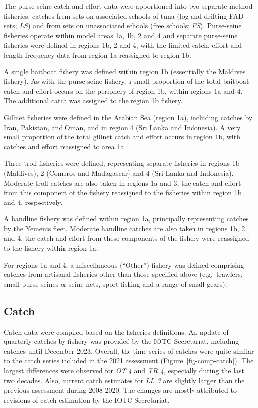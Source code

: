 \documentclass[
]{scrartcl}
\begin{document}
The purse-seine catch and effort data were apportioned into two separate
method fisheries: catches from sets on associated schools of tuna (log
and drifting FAD sets; \emph{LS}) and from sets on unassociated schools
(free schools; \emph{FS}). Purse-seine fisheries operate within model
areas 1a, 1b, 2 and 4 and separate purse-seine fisheries were defined in
regions 1b, 2 and 4, with the limited catch, effort and length frequency
data from region 1a reassigned to region 1b.

A single baitboat fishery was defined within region 1b (essentially the
Maldives fishery). As with the purse-seine fishery, a small proportion
of the total baitboat catch and effort occurs on the periphery of region
1b, within regions 1a and 4. The additional catch was assigned to the
region 1b fishery.

Gillnet fisheries were defined in the Arabian Sea (region 1a), including
catches by Iran, Pakistan, and Oman, and in region 4 (Sri Lanka and
Indonesia). A very small proportion of the total gillnet catch and
effort occurs in region 1b, with catches and effort reassigned to area
1a.

Three troll fisheries were defined, representing separate fisheries in
regions 1b (Maldives), 2 (Comoros and Madagascar) and 4 (Sri Lanka and
Indonesia). Moderate troll catches are also taken in regions 1a and 3,
the catch and effort from this component of the fishery reassigned to
the fisheries within region 1b and 4, respectively.

A handline fishery was defined within region 1a, principally
representing catches by the Yemenis fleet. Moderate handline catches are
also taken in regions 1b, 2 and 4, the catch and effort from these
components of the fishery were reassigned to the fishery within region
1a.

For regions 1a and 4, a miscellaneous (``Other'') fishery was defined
comprising catches from artisanal fisheries other than those specified
above (e.g.~trawlers, small purse seines or seine nets, sport fishing
and a range of small gears).

\subsection{Catch}\label{catch}

Catch data were compiled based on the fisheries definitions. An update
of quarterly catches by fishery was provided by the IOTC Secretariat,
including catches until December 2023. Overall, the time series of
catches were quite similar to the catch series included in the 2021
assessment (Figure~\ref{fig-comp-catch}). The largest differences were
observed for \emph{OT 4} and \emph{TR 4}, especially during the last two
decades. Also, current catch estimates for \emph{LL 3} are slightly
larger than the previous assessment during 2008-2020. The changes are
mostly attributed to revisions of catch estimation by the IOTC
Secretariat.
\end{document}
